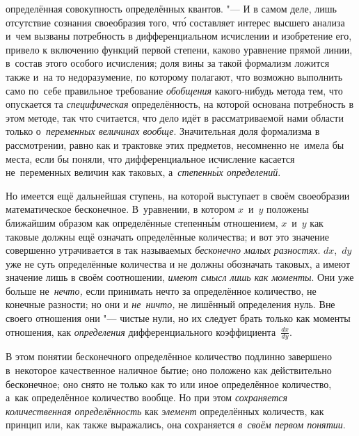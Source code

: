 определённая совокупность определённых квантов. "--- И в самом деле, лишь
отсутствие сознания своеобразия того, чт\'{о} составляет интерес высшего анализа
и~чем вызваны потребность в дифференциальном исчислении и изобретение его,
привело к включению функций первой степени, каково уравнение прямой линии,
в~состав этого особого исчисления; доля вины за такой формализм ложится также
и~на то недоразумение, по которому полагают, что возможно выполнить само
по~себе правильное требование {\em обобщения} какого-нибудь метода тем, что
опускается та {\em специфическая} определённость, на которой основана
потребность в этом методе, так что считается, что дело идёт в рассматриваемой
нами области только о~{\em переменных величинах вообще}. Значительная доля
формализма в рассмотрении, равно как и трактовке этих предметов, несомненно
не~имела бы места, если бы поняли, что дифференциальное исчисление касается
не~переменных величин как таковых, а~{\em степенн\'{ы}х определений}.

Но имеется ещё дальнейшая ступень, на которой выступает в своём своеобразии
математическое бесконечное. В~уравнении, в котором $x$~и~$y$ положены ближайшим
образом как определённые степенн\'{ы}м отношением, $x$~и~$y$ как
таковые должны ещё означать определённые количества; и вот это
значение совершенно утрачивается в так называемых
{\em бесконечно малых разностях}. $dx$,~$dy$ уже не суть определённые
количества и не должны обозначать таковых, а имеют значение лишь в своём
соотношении, {\em имеют смысл лишь как моменты}. Они уже больше
не~{\em нечто,} если принимать нечто за определённое количество, не конечные
разности; но они и {\em не~ничто,} не лишённый определения нуль. Вне своего
отношения они "--- чистые нули, но их следует брать только как моменты
отношения, как {\em определения} дифференциального
коэффициента~$\frac{dx}{dy}$.

В этом понятии бесконечного определённое количество подлинно завершено
в~некоторое качественное наличное бытие; оно положено как действительно
бесконечное; оно снято не только как то или иное определённое количество,
а~как определённое количество вообще. Но при этом
{\em сохраняется количественная определённость} как {\em элемент}
определённых количеств, как принцип или, как также выражались,
она сохраняется {\em в~своём первом понятии}.

